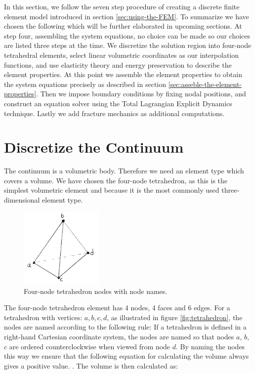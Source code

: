 

\label{sec:applying-fem}
In this section, we follow the seven step procedure of creating a
discrete finite element model introduced in section
\vref{sec:using-the-FEM}.
%
To summarize we have chosen the following which will be further
elaborated in upcoming sections. At step four, assembling the system
equations, no choice can be made so our choices are listed three steps
at the time.
%
We discretize the solution region into four-node tetrahedral elements,
select linear volumetric coordinates as our interpolation
functions, and use elasticity theory and energy preservation to
describe the element properties.
%
At this point we assemble the element properties to obtain the system
equations precisely as described in section
\vref{sec:asseble-the-element-properties}.
%
Then we impose boundary conditions by fixing nodal positions, and
construct an equation solver using the Total Lagrangian Explicit
Dynamics technique. Lastly we add fracture mechanics as additional
computations.

\section{Discretize the Continuum}
The continuum is a volumetric body. Therefore we need an element type
which covers a volume. We have chosen the four-node tetrahedron, as this
is the simplest volumetric element and because it is the most commonly
used three-dimensional element type.

\begin{figure}
  \centering
  \includegraphics[width=4cm]{./images/finite_element_method_tetrahedron.png}
\caption{Four-node tetrahedron nodes with node names.}
\label{fig:tetrahedron}
\end{figure}

The four-node tetrahedron element has 4 nodes, 4 faces and 6 edges.
For a tetrahedron with vertices: $a,b,c,d$, as illustrated in figure
\vref{fig:tetrahedron}, the nodes are named according to the following
rule: If a tetrahedron is defined in a right-hand
Cartesian coordinate system, the nodes are named so that nodes $a$,
$b$, $c$ are ordered counterclockwise when viewed from node $d$. By
naming the nodes this way we ensure that the following equation for
calculating the volume always gives a positive value.
.
%
The volume is then calculated as:

